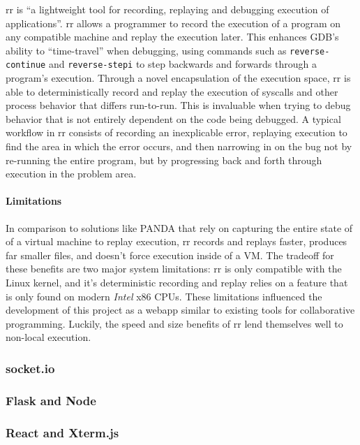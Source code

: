 \documentclass[12pt]{article}
\begin{document}
rr is ``a lightweight tool for recording, replaying and debugging
execution of applications''.\cite{rr-repo} rr allows a programmer to
record the execution of a program on any compatible machine and replay
the execution later.  This enhances GDB's ability to ``time-travel''
when debugging, using commands such as \lstinline{reverse-continue}
and \lstinline{reverse-stepi}\cite{gdbman} to step backwards and
forwards through a program's execution.  Through a novel encapsulation
of the execution space, rr is able to deterministically record and
replay the execution of syscalls and other process behavior that
differs run-to-run.  This is invaluable when trying to debug behavior
that is not entirely dependent on the code being debugged.  A typical
workflow in rr consists of recording an inexplicable error, replaying
execution to find the area in which the error occurs, and then
narrowing in on the bug not by re-running the entire program, but by
progressing back and forth through execution in the problem area.

\paragraph{Limitations}

In comparison to solutions like PANDA\cite{10.1145/2843859.2843867}
that rely on capturing the entire state of of a virtual machine to
replay execution, rr records and replays faster, produces far smaller
files, and doesn't force execution inside of a
VM.\cite{DBLP:journals/corr/OCallahanJFHNP17} The tradeoff for these
benefits are two major system limitations: rr is only compatible with
the Linux kernel, and it's deterministic recording and replay relies
on a feature that is only found on modern \textit{Intel} x86 CPUs.
These limitations influenced the development of this project as a
webapp similar to existing tools for collaborative programming.
Luckily, the speed and size benefits of rr lend themselves well to
non-local execution.

\subsubsection{socket.io}\label{socketio}

\subsubsection{Flask and Node}\label{flask/node}

\subsubsection{React and Xterm.js}\label{react}
\end{document}
